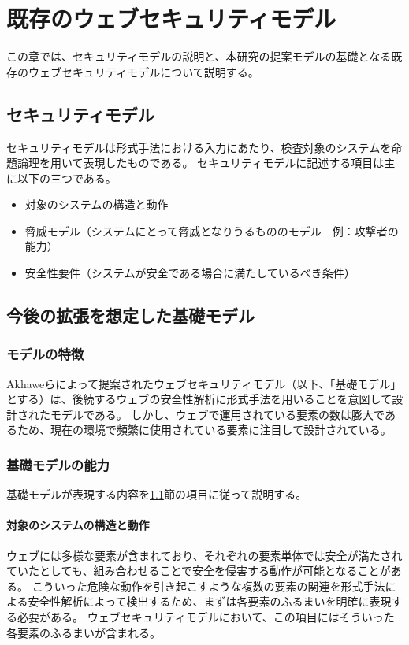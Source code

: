 \documentclass[12pt,a4paper]{jbook}
\begin{document}
\chapter{既存のウェブセキュリティモデル}
この章では、セキュリティモデルの説明と、本研究の提案モデルの基礎となる既存のウェブセキュリティモデルについて説明する。

\section{セキュリティモデル}
\label{sec:SecurityModel}
セキュリティモデルは形式手法における入力にあたり、検査対象のシステムを命題論理を用いて表現したものである。
セキュリティモデルに記述する項目は主に以下の三つである。
\begin{itemize}
\item 対象のシステムの構造と動作
\item 脅威モデル（システムにとって脅威となりうるもののモデル　例：攻撃者の能力）
\item 安全性要件（システムが安全である場合に満たしているべき条件）
\end{itemize}

\section{今後の拡張を想定した基礎モデル}
\label{sec:based-model}

\subsection{モデルの特徴}
\label{sec:based-model-abstract}
Akhaweらによって提案されたウェブセキュリティモデル\cite{based-model}（以下、「基礎モデル」とする）は、後続するウェブの安全性解析に形式手法を用いることを意図して設計されたモデルである。
しかし、ウェブで運用されている要素の数は膨大であるため、現在の環境で頻繁に使用されている要素に注目して設計されている。

\subsection{基礎モデルの能力}
\label{sec:based-model-power}
基礎モデルが表現する内容を\ref{sec:SecurityModel}節の項目に従って説明する。

\subsubsection{対象のシステムの構造と動作}
ウェブには多様な要素が含まれており、それぞれの要素単体では安全が満たされていたとしても、組み合わせることで安全を侵害する動作が可能となることがある。
こういった危険な動作を引き起こすような複数の要素の関連を形式手法による安全性解析によって検出するため、まずは各要素のふるまいを明確に表現する必要がある。
ウェブセキュリティモデルにおいて、この項目にはそういった各要素のふるまいが含まれる。
\end{document}
